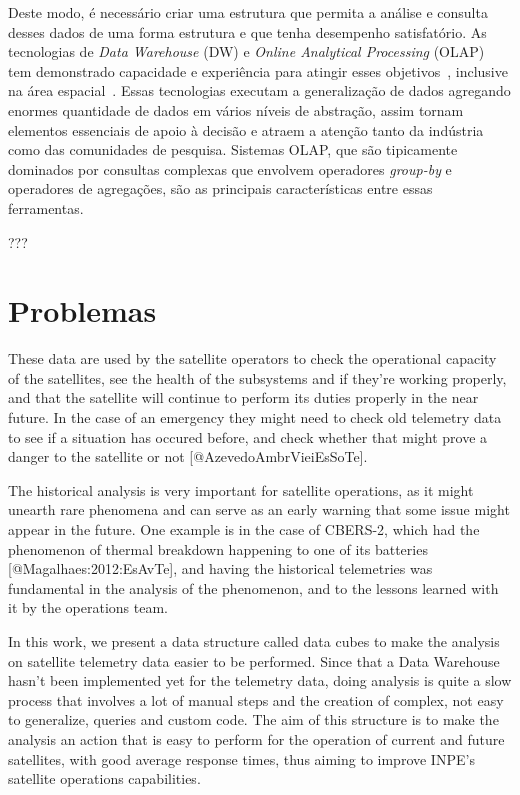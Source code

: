 Deste modo, é necessário criar uma estrutura que permita a análise e consulta desses dados de uma forma estrutura e que tenha desempenho satisfatório.
As tecnologias de \textit{Data Warehouse} (DW) e \textit{Online Analytical Processing} (OLAP) tem demonstrado capacidade e experiência para atingir esses objetivos~\cite{bimonteOpenIssuesBig2016}, inclusive na área espacial~\cite{yvernesCopernicusGroundSegment2018}.
Essas tecnologias executam a generalização de dados agregando enormes quantidade de dados em vários níveis de abstração, assim tornam elementos essenciais de apoio à decisão e atraem a atenção tanto da indústria como das comunidades de pesquisa.
Sistemas OLAP, que são tipicamente dominados por consultas complexas que envolvem operadores \textit{group-by} e operadores de agregações, são as principais características entre essas ferramentas.

???


\section{Problemas}
These data are used by the satellite operators to check the operational capacity of the satellites, see the health of the subsystems and if they're working properly, and that the satellite will continue to perform its duties properly in the near future.
In the case of an emergency they might need to check old telemetry data to see if a situation has occured before, and check whether that might prove a danger to the satellite or not [@AzevedoAmbrVieiEsSoTe].

The historical analysis is very important for satellite operations, as it might unearth rare phenomena and can serve as an early warning that some issue might appear in the future.
One example is in the case of CBERS-2, which had the phenomenon of thermal breakdown happening to one of its batteries [@Magalhaes:2012:EsAvTe], and having the historical telemetries was fundamental in the analysis of the phenomenon, and to the lessons learned with it by the operations team.

In this work, we present a data structure called data cubes to make the analysis on satellite telemetry data easier to be performed.
Since that a Data Warehouse hasn't been implemented yet for the telemetry data, doing analysis is quite a slow process that involves a lot of manual steps and the creation of complex, not easy to generalize, queries and custom code.
The aim of this structure is to make the analysis an action that is easy to perform for the operation of current and future satellites, with good average response times, thus aiming to improve INPE's satellite operations capabilities.

